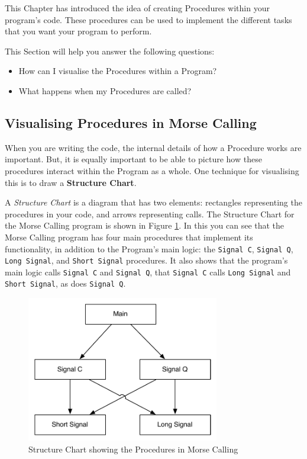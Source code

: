 This Chapter has introduced the idea of creating Procedures within your program's code. These procedures can be used to implement the different tasks that you want your program to perform. 

This Section will help you answer the following questions:
\begin{itemize}
  \item How can I visualise the Procedures within a Program?
  \item What happens when my Procedures are called?
\end{itemize}

\subsection{Visualising Procedures in Morse Calling} %
\label{sub:visualising_morse_calling}

When you are writing the code, the internal details of how a Procedure works are important. But, it is equally important to be able to picture how these procedures interact within the Program as a whole. One technique for visualising this is to draw a \textbf{Structure Chart}.

A \emph{Structure Chart} is a diagram that has two elements: rectangles representing the procedures in your code, and arrows representing calls. The Structure Chart for the Morse Calling program is shown in Figure \ref{fig:procedure-decl-morsecalling-structure}. In this you can see that the Morse Calling program has four main procedures that implement its functionality, in addition to the Program's main logic: the \texttt{Signal C}, \texttt{Signal Q}, \texttt{Long Signal}, and \texttt{Short Signal} procedures. It also shows that the program's main logic calls \texttt{Signal C} and \texttt{Signal Q}, that \texttt{Signal C} calls \texttt{Long Signal} and \texttt{Short Signal}, as does \texttt{Signal Q}.

\begin{figure}[htbp]
   \centering
   \includegraphics[width=0.75\textwidth]{./topics/procedure-decl/diagrams/MorseCallingStructureChart} 
   \caption{Structure Chart showing the Procedures in Morse Calling}
   \label{fig:procedure-decl-morsecalling-structure}
\end{figure}

